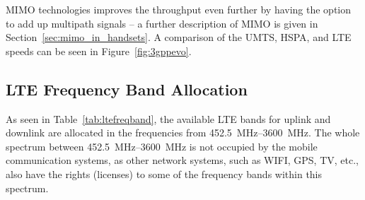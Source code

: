 MIMO technologies improves the throughput even further by having the option to add up multipath signals -- a further description of MIMO is given in Section~\ref{sec:mimo_in_handsets}. A comparison of the UMTS, HSPA, and LTE speeds can be seen in Figure~\ref{fig:3gppevo}.


\subsection{LTE Frequency Band Allocation}
As seen in Table~\ref{tab:ltefreqband}, the available LTE bands for uplink and downlink are allocated in the frequencies from \SIrange{452.5}{3600}{MHz}. The whole spectrum between \SIrange{452.5}{3600}{MHz} is not occupied by the mobile communication systems, as other network systems, such as WIFI, GPS, TV, etc., also have the rights (licenses) to some of the frequency bands within this spectrum.

